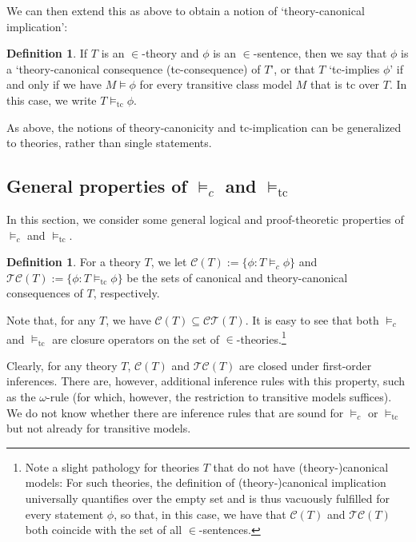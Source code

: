 \documentclass[a4paper,12pt]{amsart}
\theoremstyle{definition}
\newtheorem{defini}[fact]{Definition}
\begin{document}
We can then extend this as above to obtain a notion of `theory-canonical implication':

\begin{defini}
If $T$ is an $\in$-theory and $\phi$ is an $\in$-sentence, then we say that $\phi$ is a `theory-canonical consequence (tc-consequence) of $T$', or that $T$ `tc-implies $\phi$' if and only if 
we have $M\models\phi$ for every transitive class model $M$ that is tc over $T$. In this case, we write $T\models_{\text{tc}}\phi$.
\end{defini}



As above, the notions of theory-canonicity and tc-implication can be generalized to theories, rather than single statements. 


\subsection{General properties of $\models_{c}$ and $\models_{\text{tc}}$}

In this section, we consider some general logical and proof-theoretic properties of $\models_{c}$ and $\models_{\text{tc}}$.

\begin{defini}
For a theory $T$, we let $\mathcal{C}(T):=\{\phi:T\models_{c}\phi\}$ and $\mathcal{TC}(T):=\{\phi:T\models_{\text{tc}}\phi\}$ be the sets of canonical and theory-canonical consequences of $T$, respectively. 
\end{defini}


Note that, for any $T$, we have $\mathcal{C}(T)\subseteq\mathcal{CT}(T)$. It is easy to see that both $\models_{c}$ and $\models_{\text{tc}}$ are closure operators on the set of $\in$-theories.\footnote{Note a slight pathology for theories $T$ that do not have (theory-)canonical models: For such theories, the definition of (theory-)canonical implication universally quantifies over the empty set and is thus vacuously fulfilled for every statement $\phi$, so that, in this case, we have that $\mathcal{C}(T)$ and $\mathcal{TC}(T)$ both coincide with the set of all $\in$-sentences.}


Clearly, for any theory $T$, $\mathcal{C}(T)$ and $\mathcal{TC}(T)$ are closed under first-order inferences. There are, however, additional inference rules with this property, such as the $\omega$-rule (for which, however, the restriction to transitive models suffices). 
We do not know whether there are inference rules that are sound for $\models_{c}$ or $\models_{\text{tc}}$ but not already for transitive models.
\end{document}
